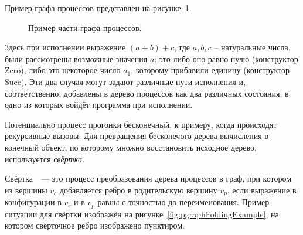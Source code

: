 Пример графа процессов представлен на рисунке~\ref{fig:pgraphExample}.
\begin{figure}[h!]
\center
{}

\caption{Пример части графа процессов.}
\label{fig:pgraphExample}
\end{figure}
Здесь при исполнении выражение $(a + b) + c$, где $a, b, c$ -- натуральные числа,
были рассмотрены возможные значения $a$: это либо оно равно нулю (конструктор Zero), либо это некоторое
число $a_1$, которому прибавили единицу (конструктор Succ). Эти два случая могут задают
различные пути исполнения и, соответственно, добавлены в дерево процессов как два различных состояния,
в одно из которых войдёт программа при исполнении.



Потенциально процесс прогонки бесконечный, к примеру, когда происходят рекурсивные вызовы.
Для превращения бесконечого дерева вычисления в конечный объект, по которому множно
восстановить исходное дерево, используется \emph{свёртка.}

Свёртка~~--- это процесс преобразования дерева процессов в граф, при котором
из вершины $v_c$ добавляется ребро в родительскую вершину $v_p$,
если выражение в конфигурации в $v_c$ и в $v_p$ равны с точностью до переименования.
Пример ситуации для свёртки изображён на рисунке~\ref{fig:pgraphFoldingExample},
на котором свёрточное ребро изображено пунктиром.

